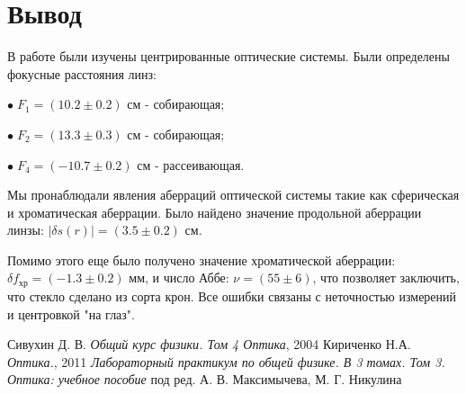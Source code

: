 \documentclass[12pt,a4paper]{article}
\begin{document}
	
	\section*{Вывод}
	В работе были изучены центрированные оптические системы. Были определены фокусные расстояния линз:
	
	$\bullet \; F_1 = (10.2 \pm 0.2)$ см - собирающая;

	$\bullet \; F_2 = (13.3 \pm 0.3)$ см - собирающая;

	$\bullet \; F_4 = (-10.7 \pm 0.2)$ см - рассеивающая.
	
	Мы пронаблюдали явления аберраций оптической системы такие как сферическая и хроматическая аберрации. Было найдено значение продольной аберрации линзы: $|\delta s(r)| = (3.5 \pm 0.2)$ см.
	
	Помимо этого еще было получено значение хроматической аберрации: $\delta f_{\text{хр}} = (-1.3 \pm 0.2)$ мм, и число Аббе: $\nu = (55 \pm 6)$, что позволяет заключить, что стекло сделано из сорта крон. Все ошибки связаны с неточностью измерений и центровкой "на глаз".


    \newpage
    \begin{thebibliography}{9}
    	 Сивухин Д. В. \emph{Общий курс физики. Том 4 Оптика}, 2004
    	 Кириченко Н.А. \emph{Оптика.}, 2011
    	 \emph{Лабораторный практикум по общей физике. В 3 томах. Том 3. Оптика: учебное пособие} под ред. А. В. Максимычева, М. Г. Никулина
    \end{thebibliography}
    
    
\end{document}
